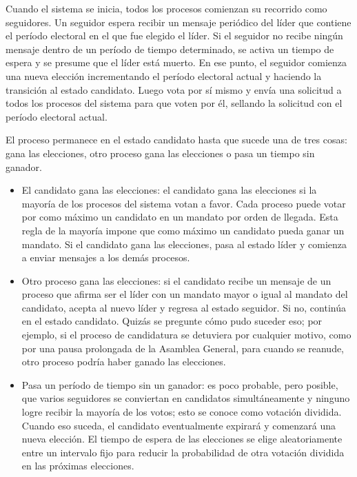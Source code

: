 {Cuando el sistema se inicia, todos los procesos comienzan su recorrido como seguidores. Un seguidor espera recibir un mensaje periódico del líder que contiene el período electoral en el que fue elegido el líder. Si el seguidor no recibe ningún mensaje dentro de un período de tiempo determinado, se activa un tiempo de espera y se presume que el líder está muerto. En ese punto, el seguidor comienza una nueva elección incrementando el período electoral actual y haciendo la transición al estado candidato. Luego vota por sí mismo y envía una solicitud a todos los procesos del sistema para que voten por él, sellando la solicitud con el período electoral actual.

El proceso permanece en el estado candidato hasta que sucede una de tres cosas: gana las elecciones, otro proceso gana las elecciones o pasa un tiempo sin ganador.

\begin{itemize}
	\item El candidato gana las elecciones: el candidato gana las elecciones si la mayoría de los procesos del sistema votan a favor. Cada proceso puede votar por como máximo un candidato en un mandato por orden de llegada. Esta regla de la mayoría impone que como máximo un candidato pueda ganar un mandato. Si el candidato gana las elecciones, pasa al estado líder y comienza a enviar mensajes a los demás procesos.
	\item Otro proceso gana las elecciones: si el candidato recibe un mensaje de un proceso que afirma ser el líder con un mandato mayor o igual al mandato del candidato, acepta al nuevo líder y regresa al estado seguidor. Si no, continúa en el estado candidato. Quizás se pregunte cómo pudo suceder eso; por ejemplo, si el proceso de candidatura se detuviera por cualquier motivo, como por una pausa prolongada de la Asamblea General, para cuando se reanude, otro proceso podría haber ganado las elecciones.
	\item Pasa un período de tiempo sin un ganador: es poco probable, pero posible, que varios seguidores se conviertan en candidatos simultáneamente y ninguno logre recibir la mayoría de los votos; esto se conoce como votación dividida. Cuando eso suceda, el candidato eventualmente expirará y comenzará una nueva elección. El tiempo de espera de las elecciones se elige aleatoriamente entre un intervalo fijo para reducir la probabilidad de otra votación dividida en las próximas elecciones.

\end{itemize}

}
